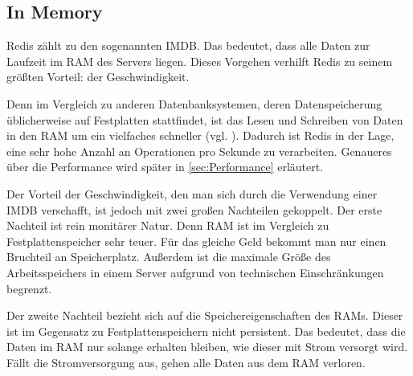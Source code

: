 
\subsection{In Memory}
\label{subsec:inMemory}

\acs{Redis} zählt zu den sogenannten \ac{IMDB}. 
Das bedeutet, dass alle Daten zur Laufzeit im \ac{RAM} des Servers liegen.
Dieses Vorgehen verhilft \acs{Redis} zu seinem größten Vorteil: der Geschwindigkeit.

Denn im Vergleich zu anderen Datenbanksystemen, deren Datenspeicherung üblicherweise auf Festplatten stattfindet, ist das Lesen und Schreiben von Daten in den \acs{RAM} um ein vielfaches schneller (vgl. \cite{VL_Rechnerarchitektur}).
Dadurch ist \acs{Redis} in der Lage, eine sehr hohe Anzahl an Operationen pro Sekunde zu verarbeiten.
Genaueres über die Performance wird später in \autoref{sec:Performance} erläutert.

\newpage Der Vorteil der Geschwindigkeit, den man sich durch die Verwendung einer \acs{IMDB} verschafft, ist jedoch mit zwei großen Nachteilen gekoppelt.
Der erste Nachteil ist rein monitärer Natur. 
Denn \acs{RAM} ist im Vergleich zu Festplattenspeicher sehr teuer. Für das gleiche Geld bekommt man nur einen Bruchteil an Speicherplatz.
Außerdem ist die maximale Größe des Arbeitsspeichers in einem Server aufgrund von technischen Einschränkungen begrenzt.

Der zweite Nachteil bezieht sich auf die Speichereigenschaften des \acs{RAM}s.
Dieser ist im Gegensatz zu Festplattenspeichern nicht persistent.
Das bedeutet, dass die Daten im \acs{RAM} nur solange erhalten bleiben, wie dieser mit Strom versorgt wird.
Fällt die Stromversorgung aus, gehen alle Daten aus dem \acs{RAM} verloren. 